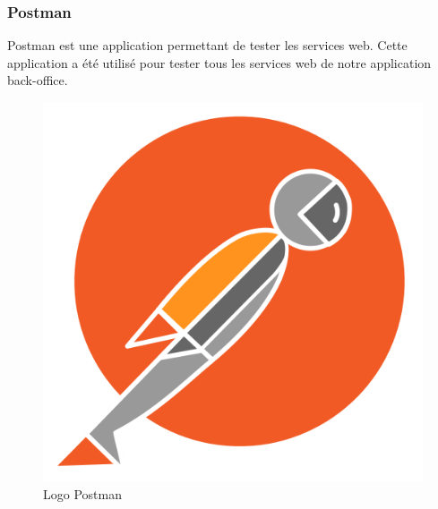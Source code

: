 \subsubsection{Postman}
\noindent\begin{minipage}{0.69\textwidth}
Postman est une application permettant de tester les services web. Cette application a été utilisé pour tester tous les services web de notre application back-office.
\end{minipage}
\begin{minipage}{0.3\textwidth}
\begin{figure}[H]
  \centering
  \includegraphics[scale=0.12]{figures/logo/postman.png}
  \caption{Logo Postman}
  \label{code27}
\end{figure}
\end{minipage}
